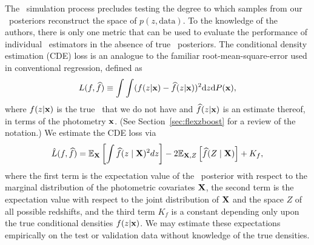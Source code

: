 The \buzz\ simulation process precludes testing the degree to which samples from our \pz\ posteriors reconstruct the space of $p(z, \mathrm{data})$.
To the knowledge of the authors, there is only one metric that can be used to evaluate the performance of individual \pzpdf\ estimators in the absence of true \pz\ posteriors.
The conditional density estimation (CDE) loss is an analogue to the familiar root-mean-square-error used in conventional regression, defined as
\begin{equation}
  \label{eq:cde-loss}
  L(f, \widehat{f}) \equiv \int \int (f(z \vert {\mathbf{x}}) - \widehat{f}(z \vert {\mathbf{x}}))^{2} \mathrm{d}z \mathrm{d}P({\mathbf{x}}) ,
\end{equation}
where $f(z \vert {\mathbf{x}})$ is the true \pzpdf\ that we do not have and $\widehat{f}(z \vert {\mathbf{x}})$ is an estimate thereof, in terms of the photometry ${\mathbf{x}}$.
(See Section~\ref{sec:flexzboost} for a review of the notation.)
We estimate the CDE loss via
\begin{equation}
  \label{eq:estimated-cde-loss}
  \hat{L}(f, \widehat{f}) = \mathbb{E}_{\mathbf{X}} \left[\int \widehat{f}(z \mid {\mathbf{X}})^{2} dz\right] - 2 \mathbb{E}_{{\mathbf{X}}, Z}\left[\widehat{f}(Z \mid {\mathbf{X}})\right] + K_{f},
\end{equation}
where the first term is the expectation value of the \pz\ posterior with respect to the marginal distribution of the photometric covariates ${\mathbf{X}}$, the second term is the expectation value with respect to the joint distribution of ${\mathbf{X}}$ and the space $Z$ of all possible redshifts, and the third term $K_{f}$ is a constant depending only upon the true conditional densities $f(z \vert {\mathbf{x}})$.
We may estimate these expectations empirically on the test or validation data \citep[Eq.~7 in][]{Izbicki:17b} without knowledge of the true densities.

